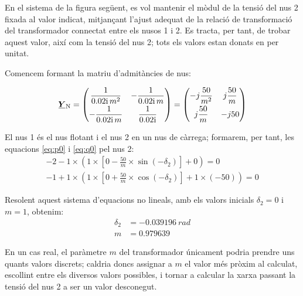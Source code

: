 	
\begin{exemple}\label{ex:ControlTensTrafo}
	\addcontentsxms{\ControlTensTrafo}
    En el sistema de la figura següent, es vol mantenir el mòdul de la
    tensió del nus 2 fixada al valor indicat, mitjançant l'ajust
    adequat de la relació de transformació del transformador connectat
    entre els nusos 1 i 2. Es tracta, per tant, de trobar aquest valor,
    així com la tensió del nus 2; tots els valors estan donats en     per unitat.

    \begin{center}
        
    \end{center}

    Comencem formant la matriu d'admitàncies de nus:
    
    \[
    \mcmplx{Y}\ped{N} = \begin{pmatrix}
    \dfrac{1}{\complexnum{j0,02} \,m^2}  &  -\dfrac{1}{\complexnum{j0,02} \,m} \\[1.5ex]
    -\dfrac{1}{\complexnum{j0,02}\, m}   & \dfrac{1}{\complexnum{j0,02}}
    \end{pmatrix} =
    \begin{pmatrix}
    -j\dfrac{50}{m^2}  &  j\dfrac{50}{m} \\[1.5ex]
    j\dfrac{50}{m}     & -j 50
    \end{pmatrix}
    \]

    El nus 1 és el nus flotant i el nus 2 en un nus de càrrega;
    formarem, per tant,  les equacions \eqref{eq:p0} i \eqref{eq:q0} pel
    nus 2:
    \begin{align*}
    -2 - 1 \times\left( 1 \times\left[ 0 -\frac{50}{m} \times\sin(-\delta_2) \right]  + 0 \right)  = 0   \\[1.5ex]
    -1 + 1 \times\left( 1 \times\left[0 + \frac{50}{m}
    \times\cos(-\delta_2) \right]  + 1\times (-50) \right)  = 0
    \end{align*}

    Resolent aquest sistema d'equacions no lineals, amb els valors
    inicials $\delta_2=0$ i $m=1$, obtenim:
    \begin{align*}
       \delta_2 &= \qty{-0,039196}{rad} \\[1ex]
       m & =\num{0,979639}
    \end{align*}

    En un cas real, el paràmetre $m$ del transformador únicament podria
    prendre uns quants valors discrets; caldria doncs assignar a $m$ el
    valor més pròxim al calculat, escollint entre els diversos valors
    possibles, i tornar a calcular la xarxa passant la tensió del nus
    2 a ser un valor desconegut.
\end{exemple}

